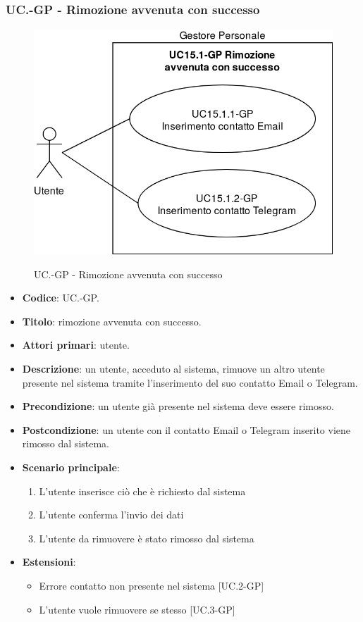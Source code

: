 	\subsubsection{UC\theuccount.\thesubuccount-GP - Rimozione avvenuta con successo}
		\begin{figure}[H]
			\centering
			\includegraphics[width=0.6\columnwidth]{img/casi_d'uso/UC15_1.png}\\
			\caption{UC\theuccount.\thesubuccount-GP - Rimozione avvenuta con successo}
		\end{figure}
		\begin{itemize}
			\item \textbf{Codice}: UC\theuccount.\thesubuccount-GP.
			\item \textbf{Titolo}: rimozione avvenuta con successo.
			\item \textbf{Attori primari}: utente.
			\item \textbf{Descrizione}: un utente, acceduto al sistema, rimuove un altro utente presente nel sistema tramite l'inserimento del suo contatto Email o Telegram.
			\item \textbf{Precondizione}: un utente già presente nel sistema deve essere rimosso.
			\item \textbf{Postcondizione}: un utente con il contatto Email o Telegram inserito viene rimosso dal sistema.
			\item \textbf{Scenario principale}:
			\begin{enumerate}
				\item L'utente inserisce ciò che è richiesto dal sistema
				\item L'utente conferma l'invio dei dati
				\item L'utente da rimuovere è stato rimosso dal sistema
			\end{enumerate}
			\item \textbf{Estensioni}:
			\begin{itemize}
				\item Errore contatto non presente nel sistema [UC\theuccount.2-GP]
				\item L'utente vuole rimuovere se stesso [UC\theuccount.3-GP]
			\end{itemize}
		\end{itemize}
			
